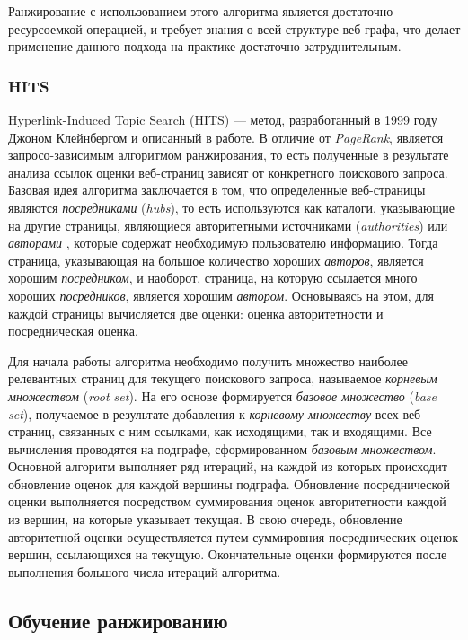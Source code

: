 Ранжирование с использованием этого алгоритма является достаточно ресурсоемкой операцией, и требует знания о всей структуре веб-графа, что делает применение данного подхода на практике достаточно затруднительным.

\subsubsection*{HITS}

Hyperlink-Induced Topic Search (HITS) --- метод, разработанный в 1999 году Джоном Клейнбергом и описанный в работе. В отличие от \textit{PageRank}, является запросо-зависимым алгоритмом ранжирования, то есть полученные в результате анализа ссылок оценки веб-страниц зависят от конкретного поискового запроса. Базовая идея алгоритма заключается в том, что определенные веб-страницы являются \textit{посредниками} (\textit{hubs}), то есть используются как каталоги, указывающие на другие страницы, являющиеся авторитетными источниками (\textit{authorities}) или \textit{авторами} \cite{wiki_hits}, которые содержат необходимую пользователю информацию. Тогда страница, указывающая на большое количество хороших \textit{авторов}, является хорошим \textit{посредником}, и наоборот, страница, на которую ссылается много хороших \textit{посредников}, является хорошим \textit{автором}. Основываясь на этом, для каждой страницы вычисляется две оценки: оценка авторитетности и посредническая оценка. 

Для начала работы алгоритма необходимо получить множество наиболее релевантных страниц для текущего поискового запроса, называемое \textit{корневым множеством} (\textit{root set}). На его основе формируется \textit{базовое множество} (\textit{base set}), получаемое в результате добавления к \textit{корневому множеству} всех веб-страниц, связанных с ним ссылками, как исходящими, так и входящими. Все вычисления проводятся на подграфе, сформированном \textit{базовым множеством}. Основной алгоритм выполняет ряд итераций, на каждой из которых происходит обновление оценок для каждой вершины подграфа. Обновление посреднической оценки выполняется посредством суммирования оценок авторитетности каждой из вершин, на которые указывает текущая. В свою очередь, обновление авторитетной оценки осуществляется путем суммировния посреднических оценок вершин, ссылающихся на текущую. Окончательные оценки формируются после выполнения большого числа итераций алгоритма.

\subsection{Обучение ранжированию}
\label{learning_to_rank}

